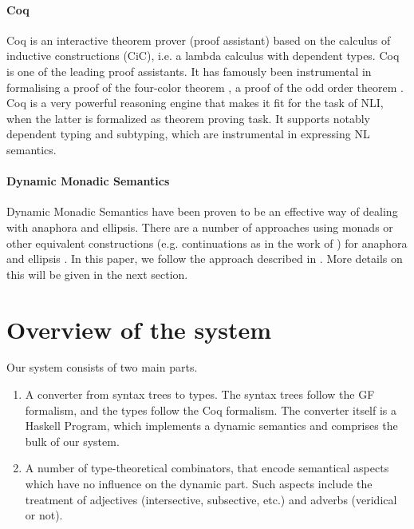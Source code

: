 \documentclass[11pt]{article}
\begin{document}
\paragraph{Coq}
Coq is an interactive theorem prover (proof assistant) based on the
calculus of inductive constructions (CiC), i.e.  a lambda calculus
with dependent types. Coq is one of the leading proof assistants. It
has famously been instrumental in formalising a proof of the
four-color theorem \citep{Gonthier:2008}, a proof of the odd order
theorem \citep{Gonthier:2013}. Coq is a very powerful reasoning engine
that makes it fit for the task of NLI, when the latter is formalized
as theorem proving task. It supports
notably dependent typing and subtyping, which are instrumental in
expressing NL semantics.

\paragraph{Dynamic Monadic Semantics}
Dynamic Monadic Semantics have been proven to be an effective way of
dealing with anaphora and ellipsis. There are a number of approaches
using monads or other equivalent constructions (e.g. continuations as in the work of
\citet{de2006}) for anaphora and ellipsis
\citet{Shan:2002,unger:2011,Barker:04,de2016,charlow:2017}. In this
paper, we follow the approach described in
\citet{bernardy_jolli}. More details on this will be given in the next
section.



\section{Overview of the system}

Our system consists of two main parts.
\begin{enumerate}[noitemsep]
\item A converter from syntax trees to types. The syntax trees follow
  the GF formalism, and the types follow the Coq formalism. The
  converter itself is a Haskell Program, which implements a dynamic
  semantics and comprises the bulk of our system.
\item A number of type-theoretical combinators, that encode semantical
  aspects which have no influence on the dynamic part. Such aspects
  include the treatment of adjectives (intersective, subsective, etc.)
  and adverbs (veridical or not).
\end{enumerate}

\end{document}
